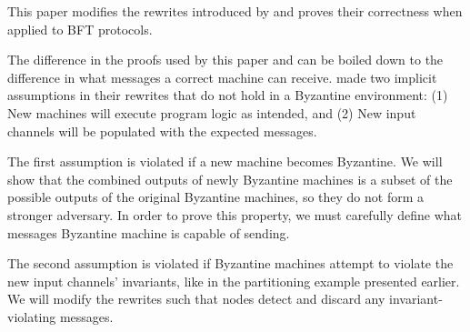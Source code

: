 This paper modifies the rewrites introduced by \sigmodpaper{} and proves their correctness when applied to BFT protocols.

The difference in the proofs used by this paper and \sigmodpaper{} can be boiled down to the difference in what messages a correct machine can receive.
\sigmodpaper{} made two implicit assumptions in their rewrites that do not hold in a Byzantine environment:
(1) New machines will execute program logic as intended, and
(2) New input channels will be populated with the expected messages.

The first assumption is violated if a new machine becomes Byzantine.
We will show that the combined outputs of newly Byzantine machines is a subset of the possible outputs of the original Byzantine machines, so they do not form a stronger adversary.
In order to prove this property, we must carefully define what messages Byzantine machine is capable of sending.

The second assumption is violated if Byzantine machines attempt to violate the new input channels' invariants, like in the partitioning example presented earlier.
We will modify the rewrites such that nodes detect and discard any invariant-violating messages.